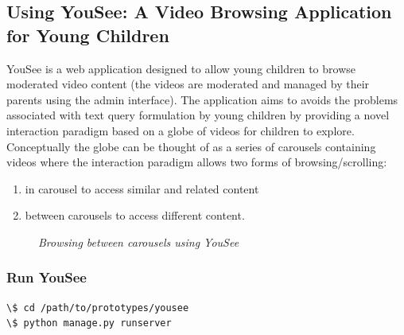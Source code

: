 \documentclass[letterpaper,10pt,english]{sphinxmanual}
\begin{document}
\subsection{Using YouSee: A Video Browsing Application for Young Children}
\label{prototypes:using-yousee-a-video-browsing-application-for-young-children}
YouSee is a web application designed to allow young children to browse moderated video content (the videos are moderated and managed by their parents using the admin interface). The application aims to avoids the problems associated with text query formulation by young children by providing a novel interaction paradigm based on a globe of videos for children to explore. Conceptually the globe can be thought of as a series of carousels containing videos where the interaction paradigm allows two forms of browsing/scrolling:
\begin{enumerate}
\item {} 
in carousel to access similar and related content

\item {} 
between carousels to access different content.

\end{enumerate}
\begin{figure}[htbp]
\centering
\capstart

\caption{\emph{Browsing between carousels using YouSee}}\end{figure}


\subsubsection{Run YouSee}
\label{prototypes:run-yousee}
\begin{Verbatim}[commandchars=\\\{\}]
\$ cd /path/to/prototypes/yousee
\$ python manage.py runserver
\end{Verbatim}
\end{document}
